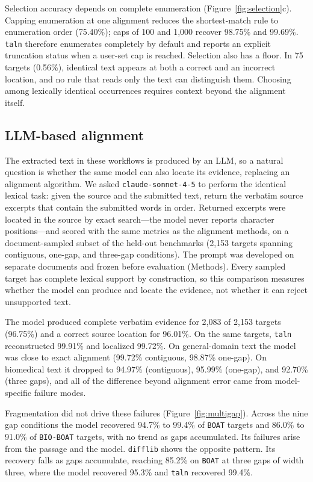 \documentclass[pdflatex,lineno,referee,sn-vancouver-num]{sn-jnl}
\theoremstyle{thmstyleone}
\theoremstyle{thmstylethree}
\theoremstyle{thmstyletwo}
\begin{document}
Selection accuracy depends on complete enumeration (Figure~\ref{fig:selection}c). Capping enumeration at one alignment reduces the shortest-match rule to enumeration order (75.40\%); caps of 100 and 1,000 recover 98.75\% and 99.69\%. \texttt{taln} therefore enumerates completely by default and reports an explicit truncation status when a user-set cap is reached. Selection also has a floor. In 75 targets (0.56\%), identical text appears at both a correct and an incorrect location, and no rule that reads only the text can distinguish them. Choosing among lexically identical occurrences requires context beyond the alignment itself.

\subsection{LLM-based alignment}
The extracted text in these workflows is produced by an LLM, so a natural question is whether the same model can also locate its evidence, replacing an alignment algorithm. We asked \texttt{claude-sonnet-4-5} to perform the identical lexical task: given the source and the submitted text, return the verbatim source excerpts that contain the submitted words in order. Returned excerpts were located in the source by exact search---the model never reports character positions---and scored with the same metrics as the alignment methods, on a document-sampled subset of the held-out benchmarks (2,153 targets spanning contiguous, one-gap, and three-gap conditions). The prompt was developed on separate documents and frozen before evaluation (Methods). Every sampled target has complete lexical support by construction, so this comparison measures whether the model can produce and locate the evidence, not whether it can reject unsupported text.

The model produced complete verbatim evidence for 2,083 of 2,153 targets (96.75\%) and a correct source location for 96.01\%. On the same targets, \texttt{taln} reconstructed 99.91\% and localized 99.72\%. On general-domain text the model was close to exact alignment (99.72\% contiguous, 98.87\% one-gap). On biomedical text it dropped to 94.97\% (contiguous), 95.99\% (one-gap), and 92.70\% (three gaps), and all of the difference beyond alignment error came from model-specific failure modes.

Fragmentation did not drive these failures (Figure~\ref{fig:multigap}). Across the nine gap conditions the model recovered 94.7\% to 99.4\% of \texttt{BOAT} targets and 86.0\% to 91.0\% of \texttt{BIO-BOAT} targets, with no trend as gaps accumulated. Its failures arise from the passage and the model. \texttt{difflib} shows the opposite pattern. Its recovery falls as gaps accumulate, reaching 85.2\% on \texttt{BOAT} at three gaps of width three, where the model recovered 95.3\% and \texttt{taln} recovered 99.4\%.
\end{document}

